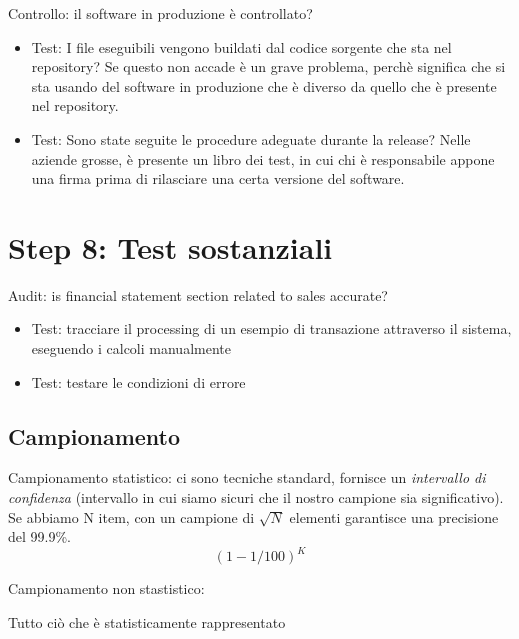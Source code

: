 Controllo: il software in produzione è controllato?
\begin{itemize}
\item Test: I file eseguibili vengono buildati dal codice sorgente che sta nel 
repository? Se questo non accade è un grave problema, perchè significa che si 
sta usando del software in produzione che è diverso da quello che è presente 
nel repository.
\item Test: Sono state seguite le procedure adeguate durante la release? Nelle 
aziende grosse, è presente un libro dei test, in cui chi è responsabile appone 
una firma prima di rilasciare una certa versione del software.
\end{itemize}


\section{Step 8: Test sostanziali}

Audit: is financial statement section related to sales accurate? 

\begin{itemize}
\item Test: tracciare il processing di un esempio di transazione attraverso il 
sistema, eseguendo i calcoli manualmente
\item Test: testare le condizioni di errore
\end{itemize}



\subsection{Campionamento}

Campionamento statistico: ci sono tecniche standard, fornisce un 
\textit{intervallo di confidenza} (intervallo in cui siamo sicuri che il nostro 
campione sia significativo). Se abbiamo N item, con un campione di $\sqrt{N}$ 
elementi garantisce una precisione del 99.9\%.
$$
(1 - 1/100)^K
$$

Campionamento non stastistico:

Tutto ciò che è statisticamente rappresentato
